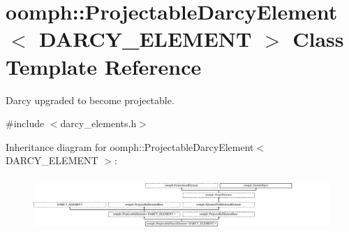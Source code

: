 \hypertarget{classoomph_1_1ProjectableDarcyElement}{}\section{oomph\+:\+:Projectable\+Darcy\+Element$<$ D\+A\+R\+C\+Y\+\_\+\+E\+L\+E\+M\+E\+NT $>$ Class Template Reference}
\label{classoomph_1_1ProjectableDarcyElement}


Darcy upgraded to become projectable.  




{\ttfamily \#include $<$darcy\+\_\+elements.\+h$>$}

Inheritance diagram for oomph\+:\+:Projectable\+Darcy\+Element$<$ D\+A\+R\+C\+Y\+\_\+\+E\+L\+E\+M\+E\+NT $>$\+:\begin{figure}[H]
\begin{center}
\leavevmode
\includegraphics[height=2.064897cm]{classoomph_1_1ProjectableDarcyElement}
\end{center}
\end{figure}
